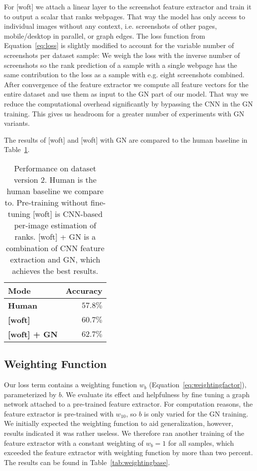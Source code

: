For [woft] we attach a linear layer to the screenshot feature extractor and train it to output a scalar that ranks webpages. That way the model has only access to individual images without any context, i.e. screenshots of other pages, mobile/desktop in parallel, or graph edges. The loss function from Equation~\ref{eq:loss} is slightly modified to account for the variable number of screenshots per dataset sample: We weigh the loss with the inverse number of screenshots so the rank prediction of a sample with a single webpage has the same contribution to the loss as a sample with e.g. eight screenshots combined. After convergence of the feature extractor we compute all feature vectors for the entire dataset and use them as input to the GN part of our model. That way we reduce the computational overhead significantly by bypassing the CNN in the GN training. This gives us headroom for a greater number of experiments with GN variants.

The results of [woft] and [woft] with GN are compared to the human baseline in Table~\ref{tab:accuracyonv2}.

\begin{table}
    \centering
    \begin{tabular}{lr}
        \textbf{Mode} & \textbf{Accuracy}\\\hline
        \textbf{Human} & $57.8\%$\\
        \textbf{[woft]} & $60.7\%$\\
        \textbf{[woft] + GN} & $\bm{62.7}\%$\\
    \end{tabular}
    \caption[Performance on dataset version 2]{Performance on dataset version 2. Human is the human baseline we compare to. Pre-training without fine-tuning [woft] is CNN-based per-image estimation of ranks. [woft] + GN is a combination of CNN feature extraction and GN, which achieves the best results.}
    \label{tab:accuracyonv2}
\end{table}

\subsection{Weighting Function}

Our loss term contains a weighting function $w_b$ (Equation~\ref{eq:weightingfactor}), parameterized by $b$. We evaluate its effect and helpfulness by fine tuning a graph network attached to a pre-trained feature extractor. For computation reasons, the feature extractor is pre-trained with $w_{10}$, so $b$ is only varied for the GN training. We initially expected the weighting function to aid generalization, however, results indicated it was rather useless. We therefore ran another training of the feature extractor with a constant weighting of $w_b=1$ for all samples, which exceeded the feature extractor with weighting function by more than two percent. The results can be found in Table~\ref{tab:weightingbase}.

